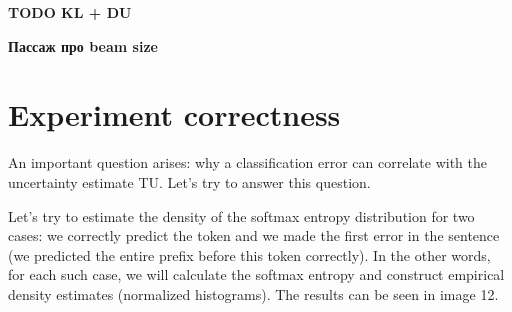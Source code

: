 \documentclass[a4paper,14pt]{extarticle}
\begin{document}
	\textbf{TODO KL + DU}
	
	\textbf{Пассаж про beam size}

	\begin{figure}[t]
	\end{figure}
	
\section{Experiment correctness}
	An important question arises: why a classification error can correlate with the uncertainty estimate TU. Let's try to answer this question.
	
	\begin{figure}[t]
	\end{figure}
	
	Let's try to estimate the density of the softmax entropy distribution for two cases: we correctly predict the token and we made the first error in the sentence (we predicted the entire prefix before this token correctly). In the other words, for each such case, we will calculate the softmax entropy and construct empirical density estimates (normalized histograms). The results can be seen in image 12.
\end{document}
